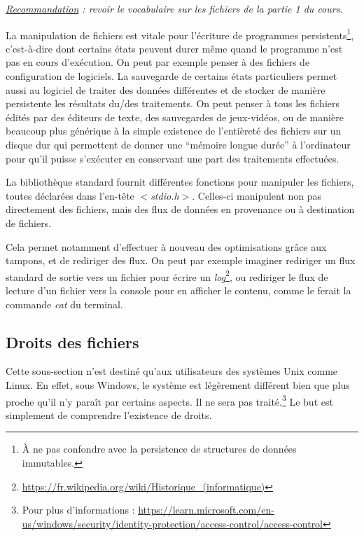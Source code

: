 \documentclass[../../../main.tex]{subfiles}
\begin{document}
\textit{\underline{Recommandation} : revoir le vocabulaire sur les fichiers de la partie 1 du cours}.
 
La manipulation de fichiers est vitale pour l'écriture de programmes persistents\footnote{À ne pas confondre avec la persistence de structures de données immutables.}, c'est-à-dire dont certains états peuvent durer même quand le programme n'est pas en cours d'exécution. On peut par exemple penser à des fichiers de configuration de logiciels. La sauvegarde de certains états particuliers permet aussi au logiciel de traiter des données différentes et de stocker de manière persistente les résultats du/des traitements. On peut penser à tous les fichiers édités par des éditeurs de texte, des sauvegardes de jeux-vidéos, ou de manière beaucoup plus générique à la simple existence de l'entièreté des fichiers sur un disque dur qui permettent de donner une ``mémoire longue durée'' à l'ordinateur pour qu'il puisse s'exécuter en conservant une part des traitements effectuées.
 
La bibliothèque standard fournit différentes fonctions pour manipuler les fichiers, toutes déclarées dans l’en-tête \textit{$<$stdio.h$>$}. Celles-ci manipulent non pas directement des fichiers, mais des flux de données en provenance ou à destination de fichiers.

Cela permet notamment d'effectuer à nouveau des optimisations grâce aux tampons, et de rediriger des flux. On peut par exemple imaginer rediriger un flux standard de sortie vers un fichier pour écrire un \textit{log}\footnote{\url{https://fr.wikipedia.org/wiki/Historique_(informatique)}}, ou rediriger le flux de lecture d'un fichier vers la console pour en afficher le contenu, comme le ferait la commande \textit{cat} du terminal.
\subsection{Droits des fichiers}
\label{sub:droits_des_fichiers}
Cette sous-section n'est destiné qu'aux utilisateurs des systèmes Unix comme Linux. En effet, sous Windows, le système est légèrement différent bien que plus proche qu'il n'y paraît par certains aspects. Il ne sera pas traité.\footnote{Pour plus d'informations : \url{https://learn.microsoft.com/en-us/windows/security/identity-protection/access-control/access-control}} Le but est simplement de comprendre l'existence de droits. 
 
\end{document}
